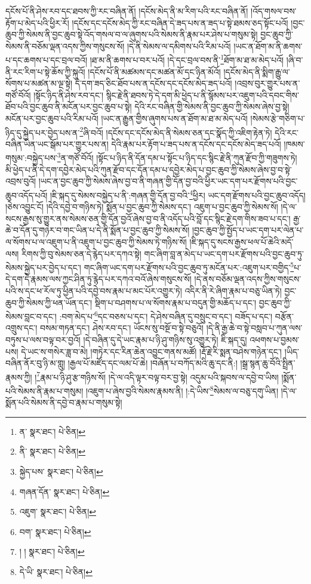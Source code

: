 དངོས་པོ་ནི་ཤེས་རབ་དང་ཐབས་ཀྱི་རང་བཞིན་ནོ། །དངོས་མེད་ནི་མ་རིག་པའི་རང་བཞིན་ནོ། །འོད་གསལ་བས་རྟོག་པ་མེད་པའི་ཕྱིར་རོ། །དངོས་དང་དངོས་མེད་ཀྱི་རང་བཞིན་དེ་ཟད་པས་ན་ཟད་པ་སྟེ་ཐམས་ཅད་སྟོང་པའོ། །བྱང་ཆུབ་ཀྱི་སེམས་ནི་བྱང་ཆུབ་སྟེ་འོད་གསལ་བ་ལ་ཞུགས་པའི་སེམས་ནི་རྣམ་པར་ཤེས་པ་གསུམ་སྟེ། བྱང་ཆུབ་ཀྱི་སེམས་ནི་བཅོམ་ལྡན་འདས་ཀྱིས་གསུངས་སོ། །དེ་ནི་སེམས་ལ་དམིགས་པའི་རིམ་པའོ། །ཡང་ན་ཐོག་མ་ནི་ཆགས་པ་དང་ཆགས་པ་དང་བྲལ་བའོ། །ཐ་མ་ནི་ཆགས་པ་བར་པའོ། །དེ་དང་བྲལ་བས་ནི་\footnote{ན་  སྣར་ཐང་།  པེ་ཅིན། }ཐོག་མ་ཐ་མ་མེད་པའོ། །ཞི་བ་ནི་རང་རིག་པ་སྟེ་ཆོས་ཀྱི་སྐུའོ། །དངོས་པོ་ནི་མཚམས་དང་མཚན་མོ་དང་ཉིན་མོའོ། །དངོས་མེད་ནི་སྨིག་རྒྱུ་ལ་སོགས་པ་མཚན་མ་ལྔ་སྟེ། དེ་དག་ཟད་ཅིང་ཐོབ་པས་ན་དངོས་དང་དངོས་མེད་ཟད་པའོ། །འབྲས་བུར་གྱུར་པས་ན་གཙོ་བོའོ། །སྟོང་ཉིད་ནི་ཤེས་རབ་དང་། སྙིང་རྗེ་ནི་ཐབས་ཏེ་དེ་དག་མི་ཕྱེད་པ་ནི་སྙོམས་པར་འཇུག་པའི་དབང་གིས་ཐོབ་པའི་བྱང་ཆུབ་ནི་མངོན་པར་བྱང་ཆུབ་པ་སྟེ། དེའི་རང་བཞིན་གྱི་སེམས་ནི་བྱང་ཆུབ་ཀྱི་སེམས་ཞེས་བྱ་སྟེ། མངོན་པར་བྱང་ཆུབ་པའི་རིམ་པའོ། །ཡང་ན་རྒྱུན་གྱིས་ཞུགས་པས་ན་ཐོག་མ་ཐ་མ་མེད་པའོ། །སེམས་རྩེ་གཅིག་པ་ཉིད་དུ་སྐྱེད་པར་བྱེད་པས་ན་\footnote{ནི་  སྣར་ཐང་།  པེ་ཅིན། }ཞི་བའོ། །དངོས་དང་དངོས་མེད་ནི་སེམས་ཅན་དང་སྣོད་ཀྱི་འཇིག་རྟེན་ཏེ། དེའི་རང་བཞིན་ཡིན་ཡང་སྒོམ་པར་གྱུར་པས་ན། དེའི་རྣམ་པར་རྟོག་པ་ཟད་པས་ན་དངོས་དང་དངོས་མེད་ཟད་པའོ། །ཁམས་གསུམ་:བསྐྱེད་པས་\footnote{སྐྱེད་པས་  སྣར་ཐང་།  པེ་ཅིན། }ན་གཙོ་བོའོ། །སྟོང་པ་ཉིད་ནི་དོན་དམ་པ་སྟོང་པ་ཉིད་དང་སྙིང་རྗེ་ནི་ཀུན་རྫོབ་ཀྱི་གཟུགས་ཏེ། མི་ཕྱེད་པ་ནི་དེ་དག་དབྱེར་མེད་པའི་ཀུན་རྫོབ་དང་དོན་དམ་པ་དབྱེར་མེད་པ་བྱང་ཆུབ་ཀྱི་སེམས་ཞེས་བྱ་བ་སྟེ་འབྲས་བུའོ། །ཡང་ན་བྱང་ཆུབ་ཀྱི་སེམས་ཞེས་བྱ་བ་ནི་གཞན་གྱི་དོན་བྱ་བའི་ཕྱིར་ཡང་དག་པར་རྫོགས་པའི་བྱང་ཆུབ་འདོད་པའོ། །ཇི་སྐད་དུ་སེམས་བསྐྱེད་པ་ནི་:གཞན་གྱི་དོན་བྱ་བའི་\footnote{གཞན་དོན་  སྣར་ཐང་།  པེ་ཅིན། }ཕྱིར། ཡང་དག་རྫོགས་པའི་བྱང་ཆུབ་འདོད། །ཅེས་འབྱུང་ངོ། །དེའི་དབྱེ་བ་གཉིས་ཏེ། སྨོན་པ་བྱང་ཆུབ་ཀྱི་སེམས་དང་། འཇུག་པ་བྱང་ཆུབ་ཀྱི་སེམས་སོ། །དེ་ལ་སངས་རྒྱས་སུ་གྱུར་ནས་སེམས་ཅན་གྱི་དོན་བྱའོ་ཞེས་བྱ་བ་ནི་འདོད་པའི་བློ་དང་སྙིང་རྗེ་དག་གིས་ཟབ་པ་དང་། རྒྱ་ཆེ་བ་དོན་དུ་གཉེར་བ་གང་ཡིན་པ་དེ་ནི་སྨོན་པ་བྱང་ཆུབ་ཀྱི་སེམས་སོ། །བྱང་ཆུབ་ཀྱི་སྤྱོད་པ་ཡང་དག་པར་ལེན་པ་ལ་སོགས་པ་ལ་འཇུག་པ་ནི་འཇུག་པ་བྱང་ཆུབ་ཀྱི་སེམས་ཏེ་གཉིས་སོ། །ཇི་སྐད་དུ་སངས་རྒྱས་ཕལ་པོ་ཆེའི་མདོ་ལས། རིགས་ཀྱི་བུ་སེམས་ཅན་དེ་རྙེད་པར་དཀའ་སྟེ། གང་ཞིག་བླ་ན་མེད་པ་ཡང་དག་པར་རྫོགས་པའི་བྱང་ཆུབ་ཏུ་སེམས་སྐྱེད་པར་བྱེད་པ་དང་། གང་ཞིག་ཡང་དག་པར་རྫོགས་པའི་བྱང་ཆུབ་ཏུ་མངོན་པར་:འཇུག་པར་བགྱིད་\footnote{འཇུག་  སྣར་ཐང་།  པེ་ཅིན། }པ་དེ་དག་དེ་རྣམས་ལས་ཀྱང་ཤིན་ཏུ་རྙེད་པར་དཀའ་བའོ་ཞེས་གསུངས་སོ། །དེ་ནས་བཅོམ་ལྡན་འདས་ཀྱིས་གསུངས་པའི་ས་དང་ཕ་རོལ་ཏུ་ཕྱིན་པའི་དབྱེ་བས་རྣམ་པ་མང་པོར་འགྱུར་ཏེ། འདིར་ནི་རེ་ཞིག་རྣམ་པ་བཅུ་ཡིན་ཏེ། བྱང་ཆུབ་ཀྱི་སེམས་ཀྱི་ཕན་ཡོན་དང་། སྡིག་པ་བཤགས་པ་ལ་སོགས་རྣམ་པ་བདུན་གྱི་མཆོད་པ་དང་། བྱང་ཆུབ་ཀྱི་སེམས་བླང་བ་དང་། :བག་མེད་པ་\footnote{བག་  སྣར་ཐང་།  པེ་ཅིན། }དང་བཅས་པ་དང་། དེ་ཤེས་བཞིན་དུ་བསྲུང་བ་དང་། བཟོད་པ་དང་། བརྩོན་འགྲུས་དང་། བསམ་གཏན་དང་། ཤེས་རབ་དང་། ཡོངས་སུ་བསྔོ་བ་སྟེ་བཅུའོ། །དེ་ནི་རྒྱ་ཆེ་བ་སྟེ་བསླབ་པ་ཀུན་ལས་བཏུས་པ་ལས་བལྟ་བར་བྱའོ། །དེ་བཞིན་དུ་དེ་ཡང་རྣམ་པ་ཉི་ཤུ་གཉིས་སུ་འགྱུར་ཏེ། ཇི་སྐད་དུ། འཕགས་པ་བྱམས་པས། དེ་ཡང་ས་གསེར་ཟླ་བ་མེ། །གཏེར་དང་རིན་ཆེན་འབྱུང་གནས་མཚོ། །རྡོ་རྗེ་རི་སྨན་བཤེས་གཉེན་དང་། །ཡིད་བཞིན་ནོར་བུ་ཉི་མ་གླུ། །རྒྱལ་པོ་མཛོད་དང་ལམ་པོ་ཆེ། །བཞོན་པ་བཀོད་མའི་ཆུ་དང་ནི:། །སྒྲ་སྙན་ཆུ་བོའི་སྤྲིན་རྣམས་ཀྱི། །\footnote{། །  སྣར་ཐང་།  པེ་ཅིན། }རྣམ་པ་ཉི་ཤུ་རྩ་གཉིས་སོ། །དེ་ལ་འདི་ལྟར་བལྟ་བར་བྱ་སྟེ། འདུམ་པའི་སྐབས་ལ་དབྱེ་བ་ཡིས། །སྨོན་པའི་སེམས་ནི་རྣམ་པ་གསུམ། །འཇུག་པ་ཞེས་བྱའི་སེམས་རྣམས་ནི། །:དེ་ཡིས་\footnote{དེ་ཡི་  སྣར་ཐང་།  པེ་ཅིན། }སེམས་ལ་བཅུ་དགུ་ཡིན། །དེ་ལ་སྨོན་པའི་སེམས་ནི་དབྱེ་བ་རྣམ་པ་གསུམ་སྟེ། 